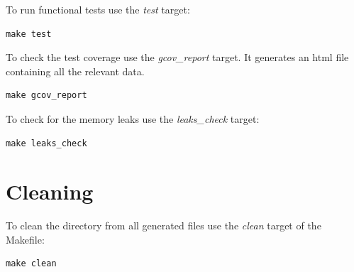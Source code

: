 \documentclass[a4paper, 12pt]{article}
\begin{document}
To run functional tests use the \textit{test} target:
\begin{verbatim}
make test
\end{verbatim}

To check the test coverage use the \textit{gcov\_report} target. It generates an html file containing all the relevant data.
\begin{verbatim}
make gcov_report
\end{verbatim}

To check for the memory leaks use the \textit{leaks\_check} target:
\begin{verbatim}
make leaks_check
\end{verbatim}

\section{Cleaning}
To clean the directory from all generated files use the \textit{clean} target of the Makefile:
\begin{verbatim}
make clean
\end{verbatim}
\end{document}
